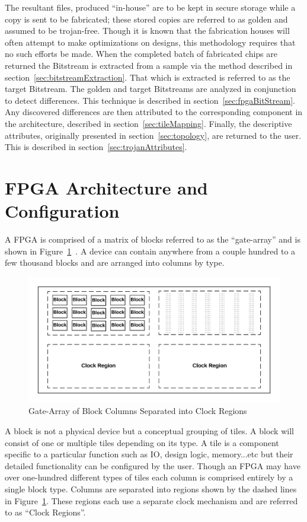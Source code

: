 The resultant files, produced ``in-house'' are to be kept in secure storage while a copy is sent to be fabricated; these stored copies are referred to as \gls{golden} and assumed to be trojan-free.
Though it is known that the fabrication houses will often attempt to make optimizations on designs, this methodology requires that no such efforts be made.
When the completed batch of fabricated chips are returned the \gls{Bitstream} is extracted from a sample via the method described in section~\ref{sec:bitstreamExtraction}. 
That which is extracted is referred to as the \gls{target} \gls{Bitstream}.
The \gls{golden} and \gls{target} \gls{Bitstream}s are analyzed in conjunction to detect differences.
This technique is described in section~\ref{sec:fpgaBitStream}.
Any discovered differences are then attributed to the corresponding component in the architecture, described in section~\ref{sec:tileMapping}.
Finally, the descriptive attributes, originally presented in section~\ref{sec:topology}, are returned to the user.
This is described in section~\ref{sec:trojanAttributes}. 


\section{FPGA Architecture and Configuration} \label{sec:architectureAndConfig}
A \Xilinx \acrfull{FPGA} is comprised of a matrix of blocks referred to as the ``gate-array'' and is shown in Figure~\ref{fig:FPGA}~\cite{xilnxDevManual}.
A device can contain anywhere from a couple hundred to a few thousand blocks and are arranged into columns by type.
\begin{figure}[h]
	\centering
	\includegraphics[width=1\linewidth]{figures/FPGA}
	\caption[Gate-Array of Block Columns Separated into Clock Regions]{Gate-Array of Block Columns Separated into Clock Regions}
	\label{fig:FPGA}
\end{figure}
A block is not a physical device but a conceptual grouping of tiles.
A block will consist of one or multiple tiles depending on its type.
A tile is a component specific to a particular function such as \acrfull{IO}, design logic, memory...etc but their detailed functionality can be configured by the user.
Though an \acrshort{FPGA} may have over one-hundred different types of tiles each column is comprised entirely by a single block type.
Columns are separated into regions shown by the dashed lines in Figure~\ref{fig:FPGA}.
These regions each use a separate clock mechanism and are referred to as ``Clock Regions''.


